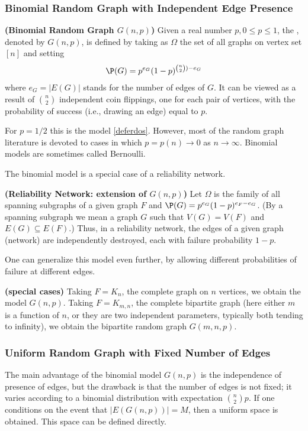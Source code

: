 \documentclass{article}
\newcommand{\bfs}[1]{\textbf{({#1}) }}
\begin{document}
\subsubsection{Binomial Random Graph with Independent Edge Presence}
\begin{defa}{\bfs{Binomial Random Graph $G (n, p)$}}
Given a real number $p, 0 \leq p \leq 1$, the , denoted by $G (n, p)$, is defined by taking as $\Omega$ the set of all graphs on vertex set $[n]$ and setting
\begin{align*}
\P (G)=p^{e_G}(1-p)^{\binom{n}{2})-e_G}
\end{align*}
where $e_{G}=|E(G)|$ stands for the number of edges of $G .$ It can be viewed as a result of $\binom{n}{2}$ independent coin flippings, one for each pair of vertices, with the probability of success (i.e., drawing an edge) equal to $p$. 
\end{defa}
\begin{rema}
For $p=1 / 2$ this is the model \cref{deferdos}. However, most of the random graph literature is devoted to cases in which $p=p(n) \rightarrow 0$ as $n \rightarrow \infty$. Binomial models are sometimes called Bernoulli.
\end{rema}

The binomial model is a special case of a reliability network. 

\begin{defa}{\bfs{Reliability Network: extension of $G (n, p)$}}
Let $\Omega$ is the family of all spanning subgraphs of a given graph $F$ and $\P (G)=p^{e_G}(1-p)^{e_{F}-e_{G}}$. (By a spanning subgraph we mean a graph $G$ such that $V(G)=V(F)$ and $E(G) \subseteq E(F) .$) Thus, in a reliability network, the edges of a given graph (network) are independently destroyed, each with failure probability $1-p$.
\end{defa}
\begin{rema}
One can generalize this model even further, by allowing different probabilities of failure at different edges. 
\end{rema}
\begin{rema}{\bfs{special cases}}
Taking $F=K_{n}$, the complete graph on $n$ vertices, we obtain the model $G (n, p) .$ Taking $F=K_{m, n}$, the complete bipartite graph (here either $m$ is a function of $n$, or they are two independent parameters, typically both tending to infinity), we obtain the bipartite random graph $G (m, n, p) .$ 
\end{rema}
\subsubsection{Uniform Random Graph with Fixed Number of Edges}
The main advantage of the binomial model $G (n, p)$ is the independence of presence of edges, but the drawback is that the number of edges is not fixed; it varies according to a binomial distribution with expectation $\binom{n}{2} p$. If one conditions on the event that $|E( G (n, p))|=M$, then a uniform space is obtained. This space can be defined directly.
\end{document}
